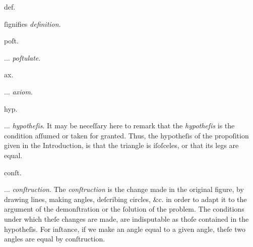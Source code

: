 \begin{minipage}[t]{0.20\textwidth}
    \begin{center}
        def.
    \end{center}
\end{minipage}
\begin{minipage}[t]{0.80\textwidth}
    ſignifies \textit{definition}.
\end{minipage}

\begin{minipage}[t]{0.20\textwidth}
    \begin{center}
        poſt.
    \end{center}
\end{minipage}
\begin{minipage}[t]{0.80\textwidth}
    $\ldots$ \textit{poſtulate}.
\end{minipage}

\begin{minipage}[t]{0.20\textwidth}
    \begin{center}
        ax.
    \end{center}
\end{minipage}
\begin{minipage}[t]{0.80\textwidth}
    $\ldots$ \textit{axiom}.
\end{minipage}

\begin{minipage}[t]{0.20\textwidth}
    \begin{center}
        hyp.
    \end{center}
\end{minipage}
\begin{minipage}[t]{0.80\textwidth}
    $\ldots$ \textit{hypotheſis}. It may be neceſſary here to remark that the \textit{hypotheſis} is the condition aſſumed or taken for granted. Thus, the hypotheſis of the propoſition given in the Introduction, is that the triangle is iſoſceles, or that its legs are equal.
\end{minipage}

\begin{minipage}[t]{0.20\textwidth}
    \begin{center}
        conſt.
    \end{center}
\end{minipage}
\begin{minipage}[t]{0.80\textwidth}
    $\ldots$ \textit{conſtruction}. The \textit{conſtruction} is the change made in the original figure, by drawing lines, making angles, deſcribing circles, \&c. in order to adapt it to the argument of the demonſtration or the ſolution of the problem. The conditions under which theſe changes are made, are indisputable as thoſe contained in the hypotheſis. For inſtance, if we make an angle equal to a given angle, theſe two angles are equal by conſtruction.
\end{minipage}

